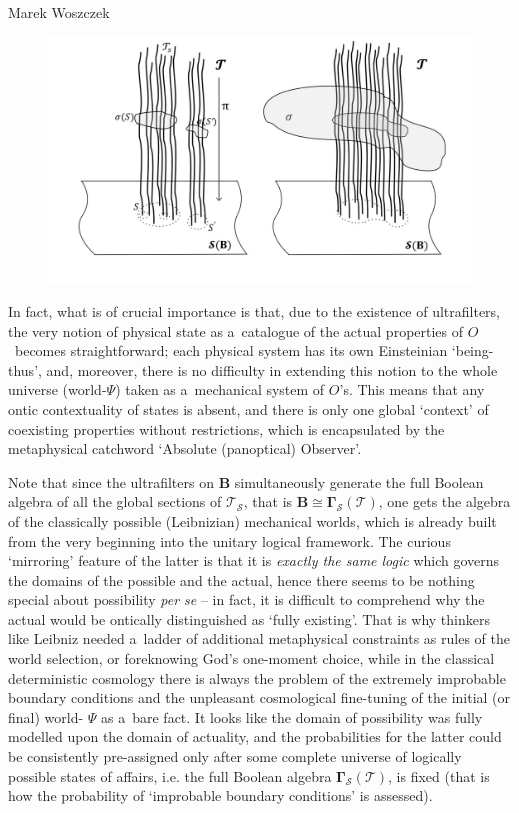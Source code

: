 \begin{artengenv}{Marek Woszczek}
\begin{figure}
\centering
\includegraphics[width=.7\textwidth]{ART_Woszczek/Woszczek.jpg}
\caption{}\label{woszczek-fig1}
\end{figure}

In fact, what is of crucial importance is that, due to the existence of ultrafilters, the very notion of physical state as a~catalogue of the actual properties of $O$~becomes straightforward; each physical system has its own Einsteinian ‘being-thus', and, moreover, there is no difficulty in extending this notion to the whole universe (world-$\Psi$) taken as a~mechanical system of $O$'s. This means that any ontic contextuality of states is absent, and there is only one global ‘context' of coexisting properties without restrictions, which is encapsulated by the metaphysical catchword ‘Absolute (panoptical) Observer'.

Note that since the ultrafilters on $\bm{B}$ simultaneously generate the full Boolean algebra of all the global sections of $\bm{\mathcal{T}}_{\mathcal{S}}$, that is $\bm{B\cong\Gamma}_{\mathcal{S}}(\mathcal{T})$, one gets the algebra of the classically possible (Leibnizian) mechanical worlds, which is already built from the very beginning into the unitary logical framework. The curious ‘mirroring' feature of the latter is that it is \textit{exactly the same logic} which governs the domains of the possible and the actual, hence there seems to be nothing special about possibility \textit{per se} -- in fact, it is difficult to comprehend why the actual would be ontically distinguished as ‘fully existing'. That is why thinkers like Leibniz needed a~ladder of additional metaphysical constraints as rules of the world selection, or foreknowing God's one-moment choice, while in the classical deterministic cosmology there is always the problem of the extremely improbable boundary conditions and the unpleasant cosmological fine-tuning of the initial (or final) world- $\Psi $ as a~bare fact. It looks like the domain of possibility was fully modelled upon the domain of actuality, and the probabilities for the latter could be consistently pre-assigned only after some complete universe of logically possible states of affairs, i.e. the full Boolean algebra $\bm{\Gamma}_{\mathcal{S}}(\mathcal{T})$, is fixed (that is how the probability of ‘improbable boundary conditions' is assessed).


\end{artengenv}
